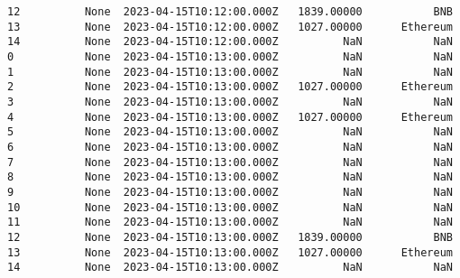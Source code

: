 \documentclass[11pt]{article}
\begin{document}
\begin{tcolorbox}[breakable, size=fbox, boxrule=.5pt, pad at break*=1mm, opacityfill=0]
\begin{Verbatim}[commandchars=\\\{\}]
12          None  2023-04-15T10:12:00.000Z   1839.00000           BNB
13          None  2023-04-15T10:12:00.000Z   1027.00000      Ethereum
14          None  2023-04-15T10:12:00.000Z          NaN           NaN
0           None  2023-04-15T10:13:00.000Z          NaN           NaN
1           None  2023-04-15T10:13:00.000Z          NaN           NaN
2           None  2023-04-15T10:13:00.000Z   1027.00000      Ethereum
3           None  2023-04-15T10:13:00.000Z          NaN           NaN
4           None  2023-04-15T10:13:00.000Z   1027.00000      Ethereum
5           None  2023-04-15T10:13:00.000Z          NaN           NaN
6           None  2023-04-15T10:13:00.000Z          NaN           NaN
7           None  2023-04-15T10:13:00.000Z          NaN           NaN
8           None  2023-04-15T10:13:00.000Z          NaN           NaN
9           None  2023-04-15T10:13:00.000Z          NaN           NaN
10          None  2023-04-15T10:13:00.000Z          NaN           NaN
11          None  2023-04-15T10:13:00.000Z          NaN           NaN
12          None  2023-04-15T10:13:00.000Z   1839.00000           BNB
13          None  2023-04-15T10:13:00.000Z   1027.00000      Ethereum
14          None  2023-04-15T10:13:00.000Z          NaN           NaN


\end{Verbatim}
\end{tcolorbox}
\end{document}
